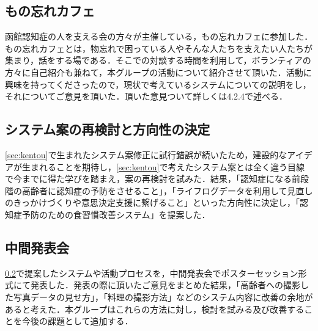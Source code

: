 \documentclass[../report]{subfiles}
\begin{document}
\subsection{もの忘れカフェ}
函館認知症の人を支える会の方々が主催している，もの忘れカフェに参加した．もの忘れカフェとは，物忘れで困っている人やそんな人たちを支えたい人たちが集まり，話をする場である．そこでの対談する時間を利用して，ボランティアの方々に自己紹介も兼ねて，本グループの活動について紹介させて頂いた．活動に興味を持ってくださったので，現状で考えているシステムについての説明をし，それについてご意見を頂いた．頂いた意見ついて詳しくは4.2.4で述べる．

\subsection{システム案の再検討と方向性の決定}\label{sec:saikentou}
\ref{sec:kentou}で生まれたシステム案修正に試行錯誤が続いたため，建設的なアイデアが生まれることを期待し，\ref{sec:kentou}で考えたシステム案とは全く違う目線で今までに得た学びを踏まえ，案の再検討を試みた．結果，「認知症になる前段階の高齢者に認知症の予防をさせること」，「ライフログデータを利用して見直しのきっかけづくりや意思決定支援に繋げること」といった方向性に決定し，「認知症予防のための食習慣改善システム」を提案した．

\subsection{中間発表会}
\ref{sec:saikentou}で提案したシステムや活動プロセスを，中間発表会でポスターセッション形式にて発表した．発表の際に頂いたご意見をまとめた結果，「高齢者への撮影した写真データの見せ方」，「料理の撮影方法」などのシステム内容に改善の余地があると考えた．本グループはこれらの方法に対し，検討を試みる及び改善することを今後の課題として追加する．
\end{document}

